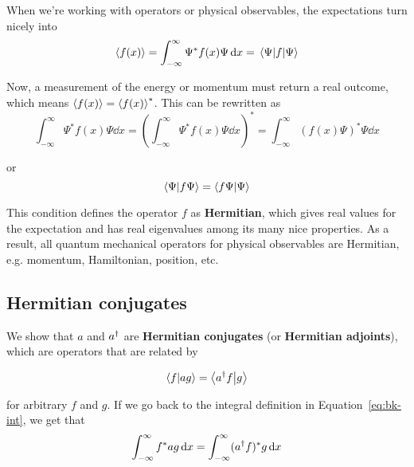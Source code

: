 When we're working with operators or physical observables, the expectations turn nicely into 
\begin{equation}
	\expval{f(x)} = \int_{-\infty}^{\infty} \Psi^* f(x) \Psi \dd{x} = \mel{\Psi}{f}{\Psi} \label{eq:expval}
\end{equation}

Now, a measurement of the energy or momentum must return a real outcome, which means $\expval{f(x)}=\expval{f(x)}^*$. This can be rewritten as
\begin{equation*}
	\int_{-\infty}^{\infty} \Psi^* f(x) \Psi \dd{x} = \left( \int_{-\infty}^{\infty} \Psi^* f(x) \Psi \dd{x} \right)^* = \int_{-\infty}^{\infty} \left( f(x) \Psi\right)^* \Psi \dd{x}
\end{equation*}

or
\begin{equation}
	\braket{\Psi}{f\Psi} = \braket{f\Psi}{\Psi} \label{eq:hermitian}
\end{equation}

This condition defines the operator $f$ as \textbf{Hermitian}, which gives real values for the expectation and has real eigenvalues among its many nice properties. As a result, all quantum mechanical operators for physical observables are Hermitian, e.g. momentum, Hamiltonian, position, etc.


\subsection{Hermitian conjugates}
We show that $a$ and $a^{\dagger}$ are \textbf{Hermitian conjugates} (or \textbf{Hermitian adjoints}), which are operators that are related by
\begin{tcolorbox}[title = Hermitian conjugates] \vspace{-2ex}
	\begin{equation}
		\braket{f}{ag} = \braket{a^{\dagger} f}{g} \label{eq:h-conj}
	\end{equation}
\end{tcolorbox}
for arbitrary $f$ and $g$. If we go back to the integral definition in Equation~\ref{eq:bk-int}, we get that
\begin{equation*}
	\int_{-\infty}^{\infty} f^*ag \dd{x} = \int_{-\infty}^{\infty} (a^{\dagger} f)^*g \dd{x}
\end{equation*}

